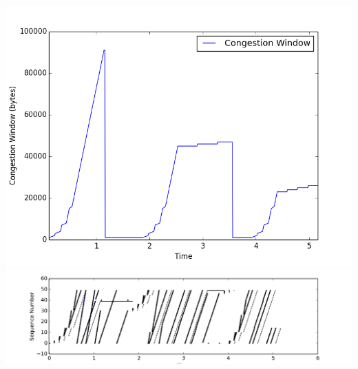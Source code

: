\documentclass[fleqn,11pt]{article}
\begin{document}
\includegraphics[width=14cm]{graphs/cwnd.png} \\
\includegraphics[width=16cm]{graphs/sequence.png}
\end{document}
